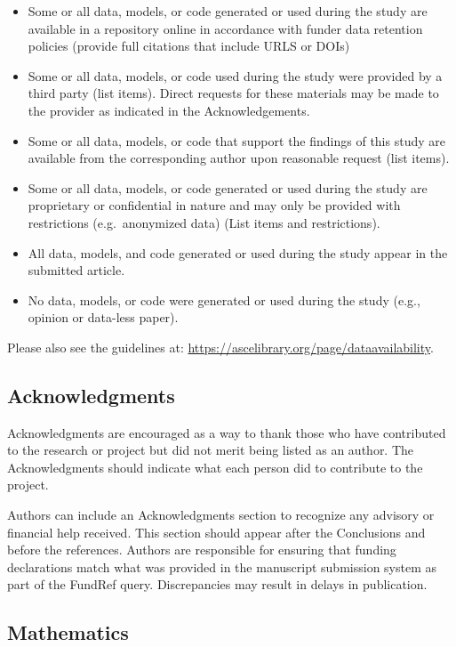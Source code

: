 \documentclass[Journal,letterpaper,NoLineNumbers]{ascelike-new}
\begin{document}
\begin{itemize}
\item Some or all data, models, or code generated or used during the study are available in a repository online in accordance with funder data retention policies (provide full citations that include URLS or DOIs)
\item Some or all data, models, or code used during the study were provided by a third party (list items).  Direct requests for these materials may be made to the provider as indicated in the Acknowledgements.
\item Some or all data, models, or code that support the findings of this study are available from the corresponding author upon reasonable request (list items).
\item Some or all data, models, or code generated or used during the study are proprietary or confidential in nature and may only be provided with restrictions (e.g.~anonymized data) (List items and restrictions).
\item All data, models, and code generated or used during the study appear in the submitted article.
\item No data, models, or code were generated or used during the study (e.g., opinion or data-less paper).
\end{itemize}

Please also see the guidelines at: \url{https://ascelibrary.org/page/dataavailability}.

\subsection{Acknowledgments}

Acknowledgments are encouraged as a way to thank those who have contributed to the research or project but did not merit being listed as an author. The Acknowledgments should indicate what each person did to contribute to the project.

Authors can include an Acknowledgments section to recognize any advisory or financial help received. This section should appear after the Conclusions and before the references. Authors are responsible for ensuring that funding declarations match what was provided in the manuscript submission system as part of the FundRef query. Discrepancies may result in delays in publication.

\subsection{Mathematics}
\end{document}
